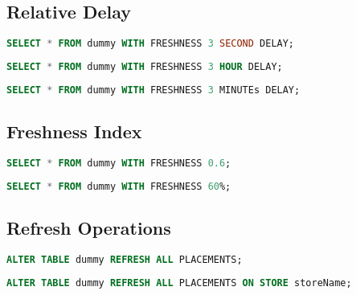 \tocless\subsection{Relative Delay}

\begin{lstlisting}[language=sql]
    SELECT * FROM dummy WITH FRESHNESS 3 SECOND DELAY;
\end{lstlisting}

\begin{lstlisting}[language=sql]
    SELECT * FROM dummy WITH FRESHNESS 3 HOUR DELAY;
\end{lstlisting}

\begin{lstlisting}[language=sql]
    SELECT * FROM dummy WITH FRESHNESS 3 MINUTEs DELAY;
\end{lstlisting}



\tocless\subsection{Freshness Index}

\begin{lstlisting}[language=sql]
    SELECT * FROM dummy WITH FRESHNESS 0.6;
\end{lstlisting}

\begin{lstlisting}[language=sql]
    SELECT * FROM dummy WITH FRESHNESS 60%;
\end{lstlisting}



\tocless\subsection{Refresh Operations}

\begin{lstlisting}[language=sql]
    ALTER TABLE dummy REFRESH ALL PLACEMENTS;
\end{lstlisting}

\begin{lstlisting}[language=sql]
    ALTER TABLE dummy REFRESH ALL PLACEMENTS ON STORE storeName;
\end{lstlisting}
